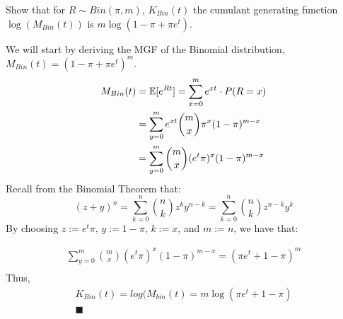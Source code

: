 Show that  for $R \sim Bin(\pi, m)$, $K_{Bin}(t)$ the cumulant generating function $\log(M_{Bin}(t))$ is $m\log(1-\pi +\pi e^t)$. 

We will start by deriving the MGF of the Binomial distribution, \\${M_{Bin}(t) = (1-\pi +\pi e^t)^m}$.
\begin{align*}
    M_{Bin}(t) &= \mathbb{E}[e^{Rt}] = \sum_{x=0}^m e^{xt}\cdot P(R=x)\\ 
               &=\sum_{y=0}^m e^{xt} {m \choose x}\pi^x(1-\pi)^{m-x}\\
                 &=\sum_{y=0}^m  {m \choose x} (e^t \pi)^x(1-\pi)^{m-x}\\
\end{align*}
Recall from the Binomial Theorem that:
\begin{equation}
    \label{bin_thm}
    (z+y)^n = \sum_{k=0}^n{n \choose k}z^{k}y^{n-k} = \sum_{k=0}^n{n \choose k}z^{n-k}y^{k}
\end{equation}
By choosing $z := e^t \pi$, $y:= 1 - \pi$, $k:=x$, and $m:=n$, we have that:

\begin{align*}
    \sum_{y=0}^m  {m \choose x} (e^t \pi)^x(1-\pi)^{m-x} = (\pi e^t + 1-\pi)^m\\
\end{align*}
Thus, 
\begin{align*}
    K_{Bin}(t) = log(M_{bin}(t) =  m\log(\pi e^t + 1-\pi)\\
    \blacksquare
\end{align*}


